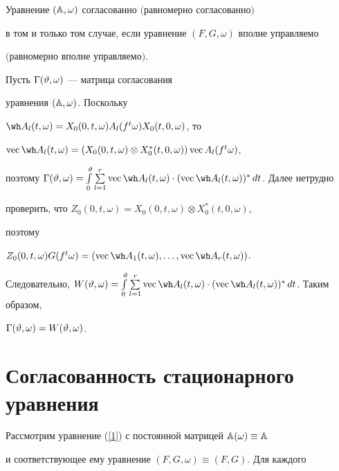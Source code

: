 \begin{thm}


\label{th5.1}


Уравнение $(\Bbb A,\omega)$ согласованно $($равномерно согласованно$)$


в том и только том случае, если уравнение $(F,G,\omega)$ вполне управляемо


$($равномерно вполне управляемо$)$.


\end{thm}





\begin{pf} Пусть $\Gamma(\vartheta,\omega)$ --- матрица согласования


уравнения $(\Bbb A,\omega)$. Поскольку


$\wh A_l(t,\omega)=X_0(0,t,\omega)A_l(f^t\omega)X_0(t,0,\omega)$, то


$\Vc\wh A_l(t,\omega)=(X_0(0,t,\omega)\otimes X_0^*(t,0,\omega))\Vc A_l(f^t\omega)$,


поэтому $\Gamma(\vt,\omega)=\int\limits_0^{\vt}\sum\limits_{l=1}^r


\Vc\wh A_l(t,\omega)\cdot(\Vc\wh A_l(t,\omega))^*\,dt$. Далее нетрудно


проверить, что $Z_0(0,t,\omega)=X_0(0,t,\omega)\otimes X_0^*(t,0,\omega)$,


поэтому


$Z_0(0,t,\omega)G(f^t\omega)=(\Vc\wh A_1(t,\omega),\dotsc,\Vc\wh A_r(t,\omega))$.


Следовательно, $W(\vt,\omega)=\int\limits_0^{\vt}\sum\limits_{l=1}^r \Vc\wh


A_l(t,\omega)\cdot(\Vc\wh A_l(t,\omega))^*\,dt$. Таким образом,


$\Gamma(\vartheta,\omega)=W(\vartheta,\omega)$.


\end{pf}





\section{Согласованность стационарного уравнения}





Рассмотрим уравнение (\ref{1}) с постоянной матрицей $\Bbb A(\omega)\equiv\Bbb A$


и соответствующее ему уравнение $(F,G,\omega)\equiv(F,G)$. Для каждого


